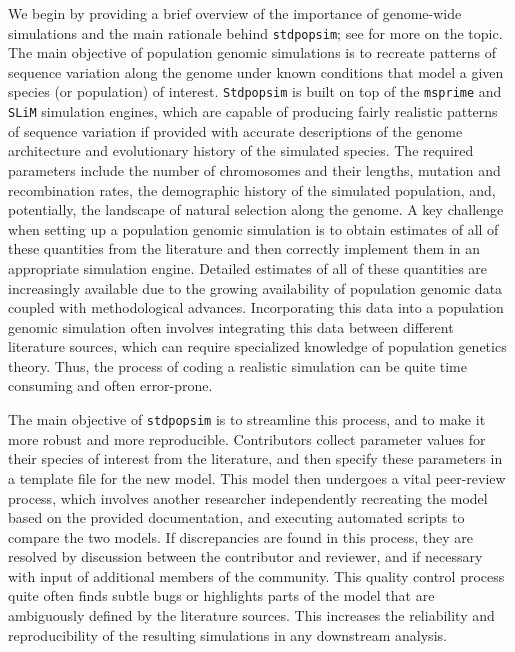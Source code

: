\documentclass[hidelinks]{article}
\newcommand{\Stdpopsim}{\texttt{Stdpopsim}\xspace}
\newcommand{\stdpopsim}{\texttt{stdpopsim}\xspace}
\begin{document}
We begin by providing a brief overview of the importance of genome-wide simulations and the main rationale behind \stdpopsim;
see \citet{Adrion2020} for more on the topic.
The main objective of population genomic simulations is to recreate 
patterns of sequence variation along the genome under known conditions
that model a given species (or population) of interest.
\Stdpopsim is built on top of the
\texttt{msprime} \citep{Kelleher2016,Nelson2020,Baumdicker2022}
and \texttt{SLiM} \citep{Haller2019} simulation engines,
which are capable of producing fairly realistic patterns of sequence variation
if provided with accurate descriptions of the genome architecture
and evolutionary history of the simulated species.
The required parameters include the number of chromosomes and their lengths,
mutation and recombination rates, the demographic history of the simulated population,
and, potentially, the landscape of natural selection along the genome.
A key challenge when setting up a population genomic simulation is to
obtain estimates of all of these quantities from the literature
and then correctly implement them in an appropriate simulation engine.
Detailed estimates of all of these quantities are increasingly available
due to the growing availability of population genomic data
coupled with methodological advances. Incorporating this data
into a population genomic simulation often involves 
integrating this data between different literature sources, which can
require specialized knowledge of population genetics theory.
Thus, the process of coding a realistic simulation can be quite time consuming and often error-prone.

The main objective of \stdpopsim is to streamline this process,
and to make it more robust and more reproducible.
Contributors collect parameter values for their species of interest from the literature,
and then specify these parameters in a template file for the new model.
This model then undergoes a vital peer-review process,
which involves another researcher independently recreating the model based on the provided documentation,
and executing automated scripts to compare the two models.
If discrepancies are found in this process, they are resolved by discussion between the contributor and reviewer,
and if necessary with input of additional members of the community.
This quality control process quite often finds subtle bugs \citep[e.g., as in][]{Ragsdale2020}
or highlights parts of the model that are ambiguously defined by the literature sources.
This increases the reliability and reproducibility of the resulting simulations in any downstream analysis.
\end{document}
